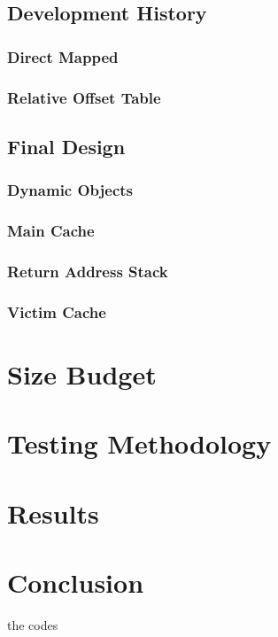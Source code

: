 \documentclass[twocolumn]{article}
\begin{document}
\subsection{Development History}
\subsubsection{Direct Mapped}
\subsubsection{Relative Offset Table}
\subsection{Final Design}
\subsubsection{Dynamic Objects}
\subsubsection{Main Cache}
\subsubsection{Return Address Stack}
\subsubsection{Victim Cache}
\section{Size Budget}
\section{Testing Methodology}
\section{Results}
\section{Conclusion}
\appendix
the codes
\end{document}
